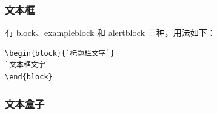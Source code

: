 \subsubsection{文本框}


有 block、exampleblock 和 alertblock 三种，用法如下：\\
\begin{lstlisting}[language={[LaTeX]TeX}]
\begin{block}{`标题栏文字`}
`文本框文字`
\end{block}
\end{lstlisting}

\subsubsection{文本盒子}


